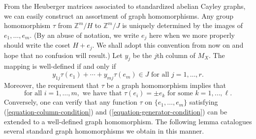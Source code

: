 \documentclass{article}
\theoremstyle{definition}
\theoremstyle{remark}
\begin{document}
From the Heuberger matrices associated to standardized abelian Cayley graphs, we can easily construct an assortment of graph homomorphisms.  Any group homomorphism $\tau$ from $\mathbb{Z}^m/H$ to $\mathbb{Z}^m/J$ is uniquely determined by the images of $e_1,\dots,e_m$.  (By an abuse of notation, we write $e_j$ here when we more properly should write the coset $H+e_j$.  We shall adopt this convention from now on and hope that no confusion will result.)  Let $y_j$ be the $j$th column of $M_X$.  The mapping is well-defined if and only if \begin{equation}\label{equation-column-condition}y_{1j}\tau(e_1)+\cdots+y_{mj}\tau(e_m)\in J\text{ for all } j=1,\dots,r.\end{equation}  Moreover, the requirement that $\tau$ be a graph homomorphism implies that\begin{equation}\label{equation-generator-condition}\text{for all }i=1,\dots,m,\text{ we have that }\tau(e_i)=\pm e_k\text{ for some }k=1,\dots,\ell.\end{equation}  Conversely, one can verify that any function $\tau$ on $\{e_1,\dots,e_m\}$ satisfying (\ref{equation-column-condition}) and (\ref{equation-generator-condition}) can be extended to a well-defined graph homomorphism.  The following lemma catalogues several standard graph homomorphisms we obtain in this manner.
\end{document}
